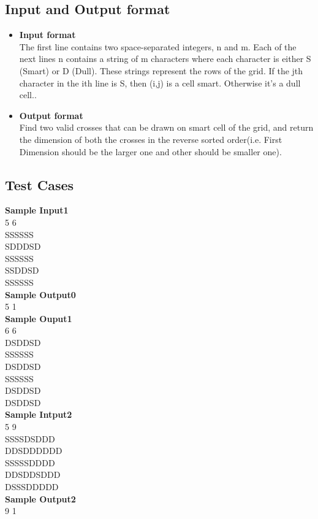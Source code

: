 \documentclass[a4paper,12pt]{article}
\begin{document}
\subsection{Input and Output format}
\begin{itemize}
\item \textbf{Input format} \\
The first line contains two space-separated integers,  n and m. 
Each of the next  lines n contains a string of  m characters where each character is either S (Smart) or D (Dull). These strings represent the rows of the grid. If the jth character in the ith  line is S, then  (i,j) is a  cell smart. Otherwise it's a  dull cell..
\item \textbf{Output format}\\
Find two valid crosses that can be drawn on smart cell of the grid, and return the dimension of both the crosses in the reverse sorted order(i.e. First Dimension should be the larger one and other should be smaller one).\\
\end{itemize}
\subsection{Test Cases}
\textbf{Sample Input1}\\
5 6 \\
SSSSSS\\
SDDDSD\\
SSSSSS\\
SSDDSD\\
SSSSSS\\
\textbf{Sample Output0} \\
5 1\\
\textbf{Sample Ouput1} \\
6 6 \\
DSDDSD\\
SSSSSS\\
DSDDSD\\
SSSSSS\\
DSDDSD\\
DSDDSD\\
\textbf{Sample Intput2} \\
5 9 \\
SSSSDSDDD\\
DDSDDDDDD\\
SSSSSDDDD\\
DDSDDSDDD\\
DSSSDDDDD\\

\textbf{Sample Output2} \\
9 1
\end{document}
